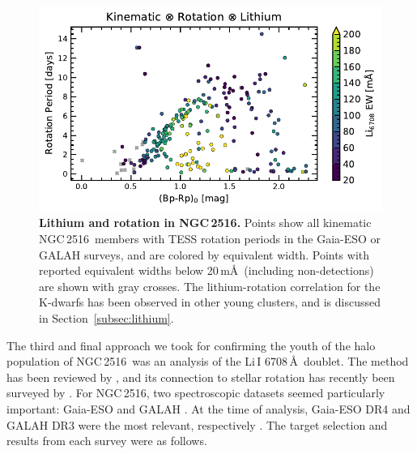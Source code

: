\documentclass[12pt,twocolumn,tighten]{aastex63}
\newcommand{\cn}{NGC\,2516} %
\begin{document}
\begin{figure}[t]
	\begin{center}
		\leavevmode
		\includegraphics[width=1\textwidth]{f5b.pdf}
	\end{center}
	\vspace{-0.7cm}
	\caption{ {\bf Lithium and rotation in NGC\,2516.}
    Points show all kinematic \cn\ members with TESS rotation periods
    in the Gaia-ESO or GALAH surveys, and are colored by equivalent
    width.  Points with reported equivalent widths below 20\,m\AA\
    (including non-detections) are shown with gray crosses.  The
    lithium-rotation correlation for the K-dwarfs has been observed in
    other young clusters, and is discussed in
    Section~\ref{subsec:lithium}.
		\label{fig:lithiumrot}
	}
\end{figure}

The third and final approach we took for confirming the youth of the
halo population of \cn\ was an analysis of the Li\,\textsc{I}
6708\,\AA\ doublet.  The method has been reviewed by
\citet{soderblom_ages_2010}, and its connection to stellar rotation
has recently been surveyed by \citet{bouvier_lithium-rotation_2020}.
For \cn, two spectroscopic datasets seemed particularly important:
Gaia-ESO \citep{gilmore_gaiaeso_2012} and GALAH
\citep{silva_galah_2015}.  At the time of analysis, Gaia-ESO DR4 and
GALAH DR3 were the most relevant, respectively \citep[{\it
e.g.},][]{randich_gaiaeso_2018,buder_galah_2020}.  The target
selection and results from each survey were as follows.
\end{document}
